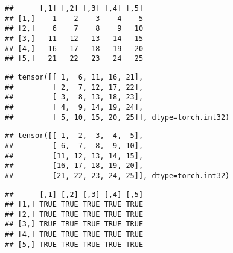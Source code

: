 \documentclass[]{book}
\newenvironment{Shaded}{\begin{snugshade}}{\end{snugshade}}
\newcommand{\CommentTok}[1]{\textcolor[rgb]{0.56,0.35,0.01}{\textit{#1}}}
\newcommand{\DataTypeTok}[1]{\textcolor[rgb]{0.13,0.29,0.53}{#1}}
\newcommand{\KeywordTok}[1]{\textcolor[rgb]{0.13,0.29,0.53}{\textbf{#1}}}
\newcommand{\NormalTok}[1]{#1}
\newcommand{\OperatorTok}[1]{\textcolor[rgb]{0.81,0.36,0.00}{\textbf{#1}}}
\newcommand{\StringTok}[1]{\textcolor[rgb]{0.31,0.60,0.02}{#1}}
\begin{document}
\begin{verbatim}
##      [,1] [,2] [,3] [,4] [,5]
## [1,]    1    2    3    4    5
## [2,]    6    7    8    9   10
## [3,]   11   12   13   14   15
## [4,]   16   17   18   19   20
## [5,]   21   22   23   24   25
\end{verbatim}

\begin{Shaded}
\end{Shaded}

\begin{verbatim}
## tensor([[ 1,  6, 11, 16, 21],
##         [ 2,  7, 12, 17, 22],
##         [ 3,  8, 13, 18, 23],
##         [ 4,  9, 14, 19, 24],
##         [ 5, 10, 15, 20, 25]], dtype=torch.int32)
\end{verbatim}

\begin{Shaded}
\end{Shaded}

\begin{verbatim}
## tensor([[ 1,  2,  3,  4,  5],
##         [ 6,  7,  8,  9, 10],
##         [11, 12, 13, 14, 15],
##         [16, 17, 18, 19, 20],
##         [21, 22, 23, 24, 25]], dtype=torch.int32)
\end{verbatim}

\begin{Shaded}
\end{Shaded}

\begin{verbatim}
##      [,1] [,2] [,3] [,4] [,5]
## [1,] TRUE TRUE TRUE TRUE TRUE
## [2,] TRUE TRUE TRUE TRUE TRUE
## [3,] TRUE TRUE TRUE TRUE TRUE
## [4,] TRUE TRUE TRUE TRUE TRUE
## [5,] TRUE TRUE TRUE TRUE TRUE
\end{verbatim}
\end{document}
